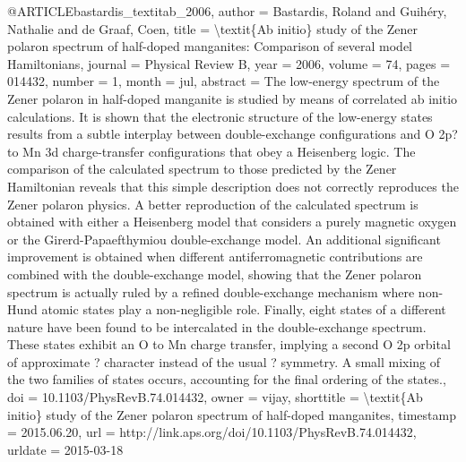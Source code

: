 @ARTICLE{bastardis_textitab_2006,
  author = {Bastardis, Roland and Guihéry, Nathalie and de Graaf, Coen},
  title = {{\textbackslash}textit\{{Ab} initio\} study of the {Zener} polaron
	spectrum of half-doped manganites: {Comparison} of several model
	{Hamiltonians}},
  journal = {Physical Review B},
  year = {2006},
  volume = {74},
  pages = {014432},
  number = {1},
  month = jul,
  abstract = {The low-energy spectrum of the Zener polaron in half-doped manganite
	is studied by means of correlated ab initio calculations. It is shown
	that the electronic structure of the low-energy states results from
	a subtle interplay between double-exchange configurations and O 2p?
	to Mn 3d charge-transfer configurations that obey a Heisenberg logic.
	The comparison of the calculated spectrum to those predicted by the
	Zener Hamiltonian reveals that this simple description does not correctly
	reproduces the Zener polaron physics. A better reproduction of the
	calculated spectrum is obtained with either a Heisenberg model that
	considers a purely magnetic oxygen or the Girerd-Papaefthymiou double-exchange
	model. An additional significant improvement is obtained when different
	antiferromagnetic contributions are combined with the double-exchange
	model, showing that the Zener polaron spectrum is actually ruled
	by a refined double-exchange mechanism where non-Hund atomic states
	play a non-negligible role. Finally, eight states of a different
	nature have been found to be intercalated in the double-exchange
	spectrum. These states exhibit an O to Mn charge transfer, implying
	a second O 2p orbital of approximate ? character instead of the usual
	? symmetry. A small mixing of the two families of states occurs,
	accounting for the final ordering of the states.},
  doi = {10.1103/PhysRevB.74.014432},
  owner = {vijay},
  shorttitle = {{\textbackslash}textit\{{Ab} initio\} study of the {Zener} polaron
	spectrum of half-doped manganites},
  timestamp = {2015.06.20},
  url = {http://link.aps.org/doi/10.1103/PhysRevB.74.014432},
  urldate = {2015-03-18}
}

